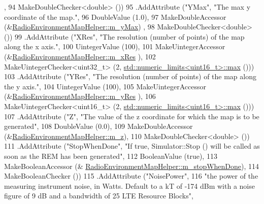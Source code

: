 \begin{DoxyCode}
      ,
94                    MakeDoubleChecker<double> ())
95     .AddAttribute (\textcolor{stringliteral}{"YMax"}, \textcolor{stringliteral}{"The max y coordinate of the map."},
96                    DoubleValue (1.0),
97                    MakeDoubleAccessor (&\hyperlink{classns3_1_1RadioEnvironmentMapHelper_af8f02bf194b74569fb9f6b843d44b2ca}{RadioEnvironmentMapHelper::m\_yMax})
      ,
98                    MakeDoubleChecker<double> ())
99    .AddAttribute (\textcolor{stringliteral}{"XRes"}, \textcolor{stringliteral}{"The resolution (number of points) of the map along the x axis."},
100                    UintegerValue (100),
101                    MakeUintegerAccessor (&\hyperlink{classns3_1_1RadioEnvironmentMapHelper_a338a6fc67e558a1870fe8815c097a680}{RadioEnvironmentMapHelper::m\_xRes}
      ),
102                   MakeUintegerChecker<uint32\_t> (2,
      \hyperlink{80211b_8c_affe776513b24d84b39af8ab0930fef7f}{std::numeric\_limits<uint16\_t>::max} ()))
103     .AddAttribute (\textcolor{stringliteral}{"YRes"}, \textcolor{stringliteral}{"The resolution (number of points) of the map along the y axis."},
104                    UintegerValue (100),
105                    MakeUintegerAccessor (&\hyperlink{classns3_1_1RadioEnvironmentMapHelper_a0d7e6c3089d6f70c1f6a5559162fbb7d}{RadioEnvironmentMapHelper::m\_yRes}
      ),
106                    MakeUintegerChecker<uint16\_t> (2,
      \hyperlink{80211b_8c_affe776513b24d84b39af8ab0930fef7f}{std::numeric\_limits<uint16\_t>::max} ()))
107     .AddAttribute (\textcolor{stringliteral}{"Z"}, \textcolor{stringliteral}{"The value of the z coordinate for which the map is to be generated"},
108                    DoubleValue (0.0),
109                    MakeDoubleAccessor (&\hyperlink{classns3_1_1RadioEnvironmentMapHelper_a4c45c1522f5ec57867cc16e38dc7dd9d}{RadioEnvironmentMapHelper::m\_z}),
110                    MakeDoubleChecker<double> ())
111     .AddAttribute (\textcolor{stringliteral}{"StopWhenDone"}, \textcolor{stringliteral}{"If true, Simulator::Stop () will be called as soon as the REM has been
       generated"},
112                    BooleanValue (\textcolor{keyword}{true}),
113                    MakeBooleanAccessor (&
      \hyperlink{classns3_1_1RadioEnvironmentMapHelper_afe704d7c118eec931eb586fdef6f6382}{RadioEnvironmentMapHelper::m\_stopWhenDone}),
114                    MakeBooleanChecker ())
115     .AddAttribute (\textcolor{stringliteral}{"NoisePower"},
116                    \textcolor{stringliteral}{"the power of the measuring instrument noise, in Watts. Default to a kT of -174 dBm with
       a noise figure of 9 dB and a bandwidth of 25 LTE Resource Blocks"},

\end{DoxyCode}
